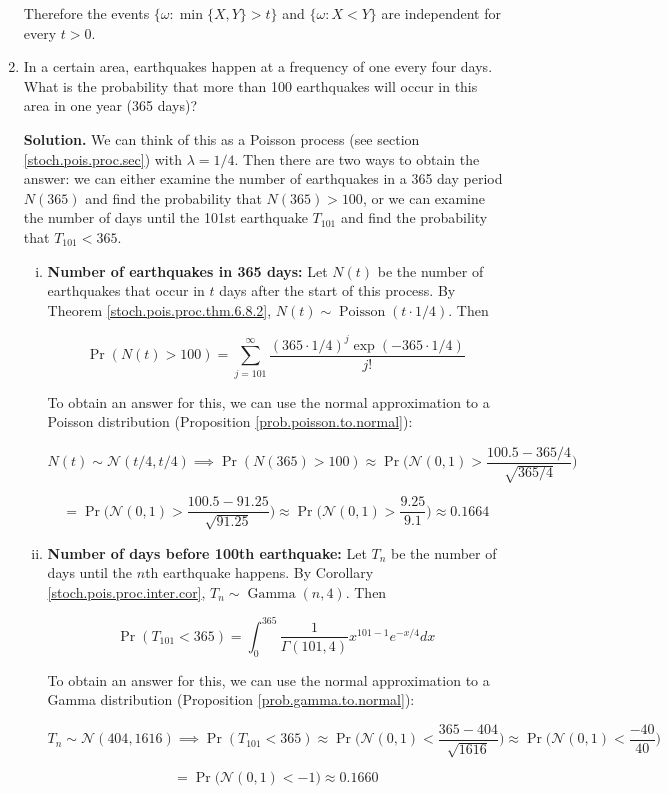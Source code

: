 \begin{enumerate}[(1)]
Therefore the events \(\{\omega: \min\{X,Y\} > t\}\) and \(\{\omega: X < Y \}\) are independent for every \(t > 0\).


\item In a certain area, earthquakes happen at a frequency of one every four days. What is the probability that more than 100 earthquakes will occur in this area in one year (365 days)?

\textbf{Solution.} We can think of this as a Poisson process (see section \ref{stoch.pois.proc.sec}) with \(\lambda = 1/4\). Then there are two ways to obtain the answer: we can either examine the number of earthquakes in a 365 day period \(N(365)\) and find the probability that \(N(365) >100\), or we can examine the number of days until the 101st earthquake \(T_{101}\) and find the probability that \(T_{101} < 365\).

\begin{enumerate}[(i)]

\item \textbf{Number of earthquakes in 365 days:} Let \(N(t)\) be the number of earthquakes that occur in \(t\) days after the start of this process. By Theorem \ref{stoch.pois.proc.thm.6.8.2}, \(N(t) \sim \operatorname{Poisson}(t \cdot 1/4)\). Then

\[
\Pr(N(t) > 100 )= \sum_{j=101}^\infty \frac{(365 \cdot 1/4)^j \exp(-365 \cdot 1/4)}{j!} 
\]

To obtain an answer for this, we can use the normal approximation to a Poisson distribution (Proposition \ref{prob.poisson.to.normal}):

\[
N(t) \sim \mathcal{N}(t/4, t/4) \implies \Pr(N(365) > 100) \approx \Pr \bigg(\mathcal{N}(0,1) > \frac{100.5 - 365/4}{\sqrt{365/4}} \bigg)
\]

\[
= \Pr \bigg(\mathcal{N}(0,1) > \frac{100.5 - 91.25}{\sqrt{91.25}} \bigg) \approx  \Pr \bigg(\mathcal{N}(0,1) > \frac{9.25}{9.1} \bigg)  \approx \boxed{0.1664}
\]

\item \textbf{Number of days before 100th earthquake:} Let \(T_n\) be the number of days until the \(n\)th earthquake happens. By Corollary \ref{stoch.pois.proc.inter.cor}, \(T_n \sim \operatorname{Gamma}(n, 4)\). Then

\[
\Pr(T_{101} < 365 )= \int_{0}^{365} \frac{1}{\Gamma(101, 4)} x^{101 - 1} e^{-x/4} dx
\]

To obtain an answer for this, we can use the normal approximation to a Gamma distribution (Proposition \ref{prob.gamma.to.normal}):

\[
T_n \sim \mathcal{N}(404, 1616) \implies \Pr(T_{101} < 365) \approx \Pr \bigg(\mathcal{N}(0,1) < \frac{365 - 404}{\sqrt{1616}} \bigg) \approx \Pr \bigg(\mathcal{N}(0,1) < \frac{-40}{40} \bigg) 
\]

\[
=  \Pr \big(\mathcal{N}(0,1) < -1 \big)   \approx \boxed{0.1660}
\]

\end{enumerate}

\end{enumerate}
